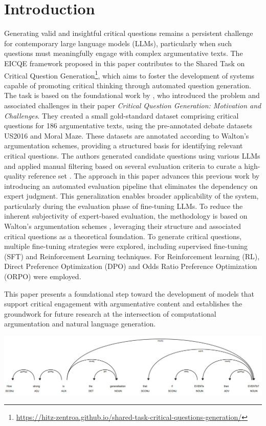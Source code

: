 \documentclass[11pt]{article}
\begin{document}
\section{Introduction}
Generating valid and insightful critical questions remains a persistent challenge for contemporary large language models (LLMs), particularly when such questions must meaningfully engage with complex argumentative texts. The EICQE framework proposed in this paper contributes to the Shared Task on Critical Question Generation\footnote{\url{https://hitz-zentroa.github.io/shared-task-critical-questions-generation/}}, which aims to foster the development of systems capable of promoting critical thinking through automated question generation. The task is based on the foundational work by \citet{calvo_figueras_critical_2024}, who introduced the problem and associated challenges in their paper \emph{Critical Question Generation: Motivation and Challenges}. They created a small gold-standard dataset comprising critical questions for 186 argumentative texts, using the pre-annotated debate datasets US2016 and Moral Maze. These datasets are annotated according to Walton's argumentation schemes, providing a structured basis for identifying relevant critical questions. The authors generated candidate questions using various LLMs and applied manual filtering based on several evaluation criteria to curate a high-quality reference set \citep{calvo_figueras_critical_2024}. The approach in this paper advances this previous work by introducing an automated evaluation pipeline that eliminates the dependency on expert judgment. This generalization enables broader applicability of the system, particularly during the evaluation phase of fine-tuning LLMs. To reduce the inherent subjectivity of expert-based evaluation, the methodology is based on Walton's argumentation schemes \citep{walton_argumentation_2008}, leveraging their structure and associated critical questions as a theoretical foundation. To generate critical questions, multiple fine-tuning strategies were explored, including supervised fine-tuning (SFT) and Reinforcement Learning techniques. For Reinforcement learning (RL), Direct Preference Optimization (DPO) and Odds Ratio Preference Optimization (ORPO) were employed. 

This paper presents a foundational step toward the development of models that support critical engagement with argumentative content and establishes the groundwork for future research at the intersection of computational argumentation and natural language generation. 
 \newpage 
\begin{strip}
    \centering
    \includegraphics[width=\linewidth]{images/cause_to_effect_cq_tree.jpg}
    \label{fig:cq-dependency-strength}
\end{strip}
\end{document}
